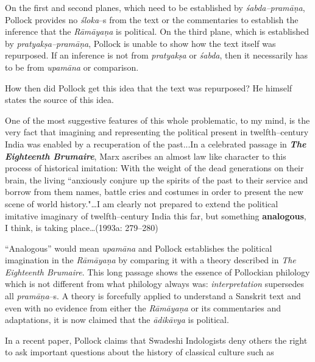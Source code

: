 On the first and second planes, which need to be established by \textit{śabda–pramāṇa}, Pollock provides no \textit{śloka}–s from the text or the commentaries to establish the inference that the\textit{ Rāmāyaṇa} is political. On the third plane, which is established by \textit{pratyakṣa–pramāṇa}, Pollock is unable to show how the text itself was repurposed. If an inference is not from \textit{pratyakṣa }or \textit{śabda}, then it necessarily has to be from \textit{upamāna} or comparison.

How then did Pollock get this idea that the text was repurposed? He himself states the source of this idea.

\begin{myquote}
One of the most suggestive features of this whole problematic, to my mind, is the very fact that imagining and representing the political present in twelfth–century India was enabled by a recuperation of the past...In a celebrated passage in \textit{\textbf{The Eighteenth Brumaire}}, Marx ascribes an almost law like character to this process of historical imitation: With the weight of the dead generations on their brain, the living ``anxiously conjure up the spirits of the past to their service and borrow from them names, battle cries and costumes in order to present the new scene of world history."…I am clearly not prepared to extend the political imitative imaginary of twelfth–century India this far, but something \textbf{analogous}, I think, is taking place…(1993a: 279–280)
\end{myquote}

“Analogous” would mean \textit{upamāna }and Pollock establishes the political imagination in the \textit{Rāmāyaṇa }by comparing it with a theory described in \textit{The Eighteenth Brumaire}. This long passage shows the essence of Pollockian philology which is not different from what philology always was: \textit{interpretation} supersedes all \textit{pramāṇa}–s. A theory is forcefully applied to understand a Sanskrit text and even with no evidence from either the \textit{Rāmāyaṇa} or its commentaries and adaptations, it is now claimed that the \textit{ādikāvya }is political.


In a recent paper, Pollock claims that Swadeshi Indologists deny others the right to ask important questions about the history of classical culture such as


